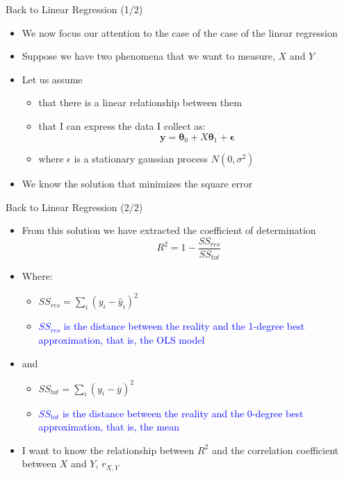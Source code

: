 \documentclass{beamer}
\begin{document}
\begin{frame}
{\centerline{Back to Linear Regression (1/2)}}
\begin{itemize}
\item We now focus our attention to the case of the case of the linear regression
\item Suppose we have two phenomena that we want to measure,  $X$ and $Y$
\item Let us assume 
\begin{itemize}
\item that there is a linear relationship between them
\item that I can express the data I collect as:
$$ \boldsymbol y = \boldsymbol \theta_0 + X  \boldsymbol \theta_1 + \boldsymbol \epsilon $$
\item where $\epsilon$ is a stationary gaussian process $N(0,\sigma^2)$
\end{itemize}
\item We know the solution that minimizes the square error
\end{itemize}
\end{frame}

\begin{frame}
{\centerline{Back to Linear Regression (2/2)}}
\begin{itemize}
\item From this solution we have extracted the coefficient of determination
$$R^2 = 1 - \frac{SS_{res}}{SS_{tot}}$$
\item Where: 
\begin{itemize}
\item $SS_{res} = \sum_i (y_i - \hat{y}_i)^2$ 
\item \textcolor{blue}{$SS_{res} $ is the distance between the reality and the 1-degree best approximation, that is, the OLS model}
\end{itemize}
\item and
\begin{itemize}
\item $SS_{tot} = \sum_i (y_i - \overline{y})^2$
\item  \textcolor{blue}{$SS_{tot}$ is the distance between the reality and the 0-degree best approximation, that is, the mean}
\end{itemize}

\item I want to know the relationship between $R^2$ and the correlation coefficient between $X$ and $Y$, $r_{X,Y}$
\end{itemize}
\end{frame}
\end{document}
